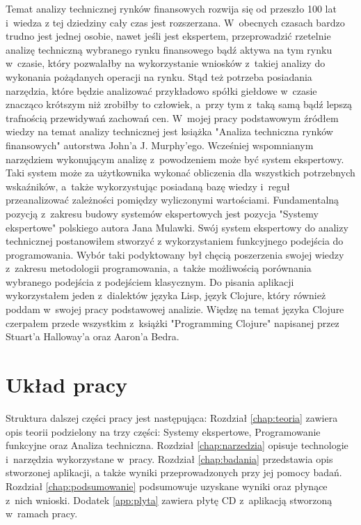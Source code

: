 Temat analizy technicznej rynków finansowych rozwija się od przeszło 100 lat i~wiedza z tej dziedziny cały czas jest rozszerzana. W~obecnych czasach bardzo trudno jest jednej osobie, nawet jeśli jest ekspertem, przeprowadzić rzetelnie analizę techniczną wybranego rynku finansowego bądź aktywa na tym rynku w~czasie, który pozwalałby na wykorzystanie wniosków z~takiej analizy do wykonania pożądanych operacji na rynku. Stąd też potrzeba posiadania narzędzia, które będzie analizować przykładowo spółki giełdowe w~czasie znacząco krótszym niż zrobiłby to człowiek, a~przy tym z~taką samą bądź lepszą trafnością przewidywań zachowań cen. W~mojej pracy podstawowym źródłem wiedzy na temat analizy technicznej jest książka "Analiza techniczna rynków finansowych"\cite{analiza} autorstwa John'a J. Murphy'ego. Wcześniej wspomnianym narzędziem wykonującym analizę z~powodzeniem może być system ekspertowy. Taki system może za użytkownika wykonać obliczenia dla wszystkich potrzebnych wskaźników, a~także wykorzystując posiadaną bazę wiedzy i~reguł przeanalizować zależności pomiędzy wyliczonymi wartościami. Fundamentalną pozycją z~zakresu budowy systemów ekspertowych jest pozycja "Systemy ekspertowe"\cite{mulawka} polskiego autora Jana Mulawki. Swój system ekspertowy do analizy technicznej postanowiłem stworzyć z wykorzystaniem funkcyjnego podejścia do programowania. Wybór taki podyktowany był chęcią poszerzenia swojej wiedzy z~zakresu metodologii programowania, a~także możliwością porównania wybranego podejścia z podejściem klasycznym. Do pisania aplikacji wykorzystałem jeden z~dialektów języka Lisp, język Clojure, który również poddam w~swojej pracy podstawowej analizie. Więdzę na temat języka Clojure czerpałem przede wszystkim z~książki "Programming Clojure" \cite{clojure} napisanej przez Stuart'a Halloway'a oraz Aaron'a Bedra.

\section{Układ pracy}

Struktura dalszej części pracy jest następująca: Rozdział \ref{chap:teoria} zawiera opis teorii podzielony na trzy części: Systemy ekspertowe, Programowanie funkcyjne oraz Analiza techniczna. Rozdział \ref{chap:narzedzia} opisuje technologie i~narzędzia wykorzystane w~pracy.  Rozdział \ref{chap:badania} przedstawia opis stworzonej aplikacji, a także wyniki przeprowadzonych przy jej pomocy badań. Rozdział \ref{chap:podsumowanie} podsumowuje uzyskane wyniki oraz płynące z~nich wnioski. Dodatek \ref{app:plyta} zawiera płytę CD z~aplikacją stworzoną w~ramach pracy.
